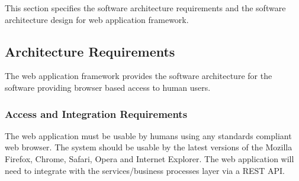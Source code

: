 This section specifies the software architecture requirements and the software
architecture design for web application framework.

\subsection{Architecture Requirements}
The web application framework provides the software architecture for the software
providing browser based access to human users.

\subsubsection{Access and Integration Requirements}
The web application must be usable by humans using any standards compliant web
browser. The system should be usable by the latest versions of the Mozilla 
Firefox, Chrome, Safari, Opera and Internet Explorer. The web
application will need to integrate with the services/business processes layer
via a REST API.

